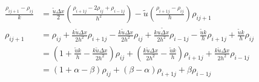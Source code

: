 \documentclass[a4paper]{article}
\begin{document}
\begin{align*}
\frac{ \rho _{i j+1} - \rho_{ij} }{k} & = \frac{\tilde{u} \Delta x}{2} \left( \frac{\rho _{i+1 j} - 2 \rho _{ij} + \rho_{i-1 j}}{h^2} \right) - \tilde{u} \left( \frac{\rho _{i+1 j} - \rho _{ij}}{h} \right)
\rho _{i j+1} \\
\rho_{ij+1}& =  \rho _{ij} + \frac{k \tilde{u} \Delta x}{2 h^2} \rho _{i +1 j} - \frac{k \tilde{u} \Delta x}{2 h^2} \rho _{ij} + \frac{k \tilde{u \Delta x}}{2 h^2} \rho _{i-1 j} - \frac{\tilde{u} k}{h} \rho _{i+1 j} + \frac{\tilde{u} k}{h} \rho_{ij} \\
& = \left( 1 + \frac{\tilde{u} k }{h} - \frac{k \tilde{u} \Delta x}{2 h^2} \right) \rho _{ij} + \left( \frac{k \tilde{u} \Delta x}{2 h^2} - \frac{\tilde{u} k}{h} \right) \rho _{i+1 j} + \frac{k \tilde{u} \Delta x}{2 h^2} \rho _{i-1 j} \\
& = \left( 1 + \alpha - \beta \right) \rho _{ij} + \left( \beta - \alpha \right) \rho _{i+1 j} + \beta \rho _{i-1 j} \\
\end{align*}
\end{document}
